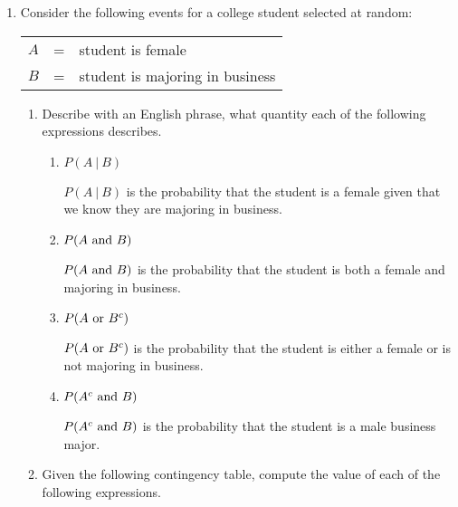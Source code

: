 \documentclass{article}
\newcommand{\answer}[1]{\color{white}#1}
\begin{document}
\pagestyle{myheadings}

\begin{center}
\textbf{}
\end{center}

\begin{enumerate}

\item Consider the following events for a college student selected at random: 
\begin{center}
\begin{tabular}{lll}
\hspace{2cm} $A$ & = & student is female \\
\hspace{2cm} $B$ & = & student is majoring in business \\
\end{tabular}
\end{center}
	\begin{enumerate}
	\item Describe with an English phrase, what quantity each of the following expressions describes.
		\begin{enumerate}
		\item $P(A\ |\ B)$ 
		
		{\answer $P(A\ |\ B)$ is the probability that the student is a female given that we know they are majoring in business.} 
		
		\item $P(A \textnormal{ and } B)$ 
		
		{\answer $P(A \textnormal{ and } B)$ is the probability that the student is both a female and majoring in business.} 
		
		\item $P(A \textnormal{ or } B^c)$ 
		
		{\answer $P(A \textnormal{ or } B^c)$ is the probability that the student is either a female or is not majoring in business.} 
		
		\item $P(A^c \textnormal{ and } B)$
		
		{\answer $P(A^c \textnormal{ and } B)$ is the probability that the student is a male business major.}
		
		\end{enumerate}
		
	\item Given the following contingency table, compute the value of each of the following expressions. 
	

\end{enumerate}
\end{enumerate}
\end{document}
